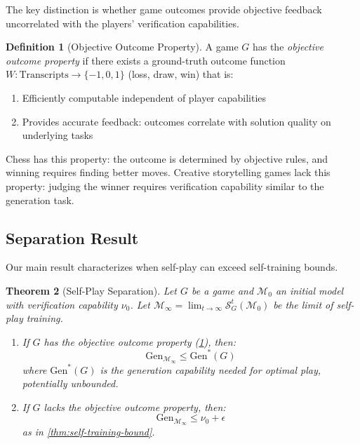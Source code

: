 \documentclass{article}
\newtheorem{theorem}{Theorem}
\theoremstyle{definition}
\newtheorem{definition}[theorem]{Definition}
\theoremstyle{remark}
\newcommand{\M}{\mathcal{M}}  %
\newcommand{\Gen}{\text{Gen}}  %
\begin{document}
The key distinction is whether game outcomes provide objective feedback uncorrelated with the players' verification capabilities.

\begin{definition}[Objective Outcome Property]
\label{def:objective-outcome}
A game \(G\) has the \emph{objective outcome property} if there exists a ground-truth outcome function \(W : \text{Transcripts} \to \{-1, 0, 1\}\) (loss, draw, win) that is:
\begin{enumerate}
\item Efficiently computable independent of player capabilities
\item Provides accurate feedback: outcomes correlate with solution quality on underlying tasks
\end{enumerate}
\end{definition}

Chess has this property: the outcome is determined by objective rules, and winning requires finding better moves. Creative storytelling games lack this property: judging the winner requires verification capability similar to the generation task.

\subsection{Separation Result}

Our main result characterizes when self-play can exceed self-training bounds.

\begin{theorem}[Self-Play Separation]
\label{thm:self-play-separation}
Let \(G\) be a game and \(\M_0\) an initial model with verification capability \(\nu_0\). Let \(\M_\infty = \lim_{t \to \infty} \mathcal{S}_G^t(\M_0)\) be the limit of self-play training.

\begin{enumerate}
\item If \(G\) has the objective outcome property (\cref{def:objective-outcome}), then:
\[
\Gen_{\M_\infty} \leq \Gen^*(G)
\]
where \(\Gen^*(G)\) is the generation capability needed for optimal play, potentially unbounded.

\item If \(G\) lacks the objective outcome property, then:
\[
\Gen_{\M_\infty} \leq \nu_0 + \epsilon
\]
as in \cref{thm:self-training-bound}.
\end{enumerate}
\end{theorem}
\end{document}
